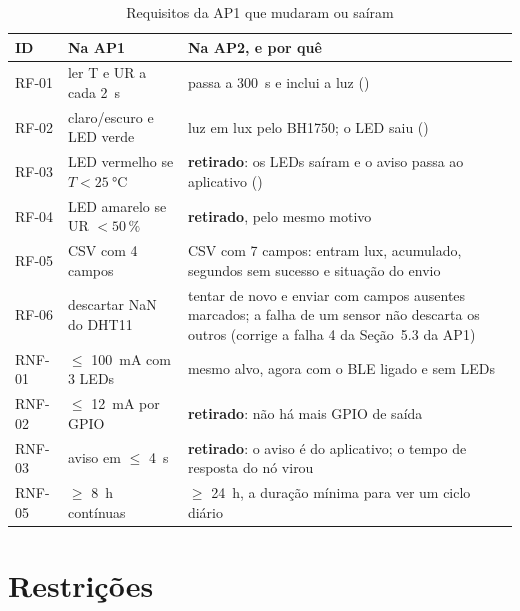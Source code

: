 \begin{table}[H]
\centering
\caption{Requisitos da AP1 que mudaram ou saíram}
\label{tab:req-mudancas}
\footnotesize
\begin{tabular}{@{}L{1.4cm}L{4.6cm}L{8.0cm}@{}}
\toprule
\textbf{ID} & \textbf{Na AP1} & \textbf{Na AP2, e por quê} \\
\midrule
RF-01  & ler T e UR a cada \SI{2}{\second} & passa a \SI{300}{\second} e inclui a luz () \\
RF-02  & claro/escuro e LED verde & luz em lux pelo BH1750; o LED saiu () \\
RF-03  & LED vermelho se $T < \SI{25}{\celsius}$ & \textbf{retirado}: os LEDs saíram e o aviso passa ao aplicativo () \\
RF-04  & LED amarelo se UR $< 50\,\%$ & \textbf{retirado}, pelo mesmo motivo \\
RF-05  & CSV com 4 campos & CSV com 7 campos: entram lux, acumulado, segundos sem sucesso e situação do envio \\
RF-06  & descartar NaN do DHT11 & tentar de novo e enviar com campos ausentes marcados; a falha de um sensor não descarta os outros (corrige a falha 4 da Seção~5.3 da AP1) \\
RNF-01 & $\leq$ \SI{100}{\milli\ampere} com 3 LEDs & mesmo alvo, agora com o BLE ligado e sem LEDs \\
RNF-02 & $\leq$ \SI{12}{\milli\ampere} por GPIO & \textbf{retirado}: não há mais GPIO de saída \\
RNF-03 & aviso em $\leq$ \SI{4}{\second} & \textbf{retirado}: o aviso é do aplicativo; o tempo de resposta do nó virou  \\
RNF-05 & $\geq$ \SI{8}{\hour} contínuas & $\geq$ \SI{24}{\hour}, a duração mínima para ver um ciclo diário \\
\bottomrule
\end{tabular}
\end{table}

\section{Restrições}

